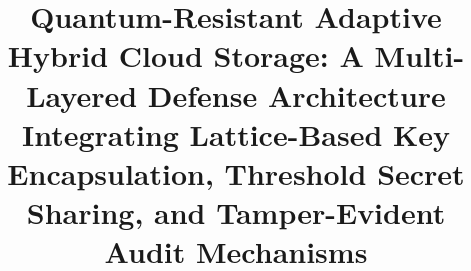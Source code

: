 \documentclass[sn-mathphys,Numbered]{sn-jnl}%
\theoremstyle{thmstyleone}%
\theoremstyle{thmstyletwo}%
\theoremstyle{thmstylethree}%
\begin{document}
\title[Quantum-Resistant Adaptive Hybrid Cloud Storage]{Quantum-Resistant Adaptive Hybrid Cloud Storage: A Multi-Layered Defense Architecture Integrating Lattice-Based Key Encapsulation, Threshold Secret Sharing, and Tamper-Evident Audit Mechanisms}

\author*[1]{ }
\author[1]{ }

\end{document}
